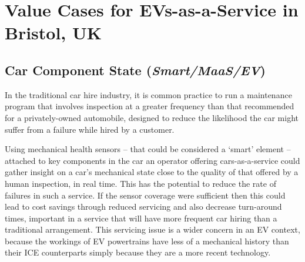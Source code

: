 \documentclass[b5paper,10pt]{article}
\begin{document}
\section{Value Cases for EVs-as-a-Service in Bristol, UK}





\subsection{Car Component State ({\emph{Smart/MaaS/EV}})}

In the traditional car hire industry, it is common practice to run a
maintenance program that involves inspection at a greater frequency
than that recommended for a privately-owned automobile, designed to
reduce the likelihood the car might suffer from a failure while hired
by a customer.

Using mechanical health sensors -- that could be considered a `smart'
element -- attached to key components in the car an operator offering
cars-as-a-service could gather insight on a car's mechanical state
close to the quality of that offered by a human inspection, in real
time. This has the potential to reduce the rate of failures in such a
service. If the sensor coverage were sufficient then this could lead
to cost savings through reduced servicing and also decrease
turn-around times, important in a service that will have more frequent
car hiring than a traditional arrangement. This servicing issue is a
wider concern in an EV context, because the workings of EV
powertrains have less of a mechanical history than their ICE
counterparts simply because they are a more recent technology.
\end{document}

